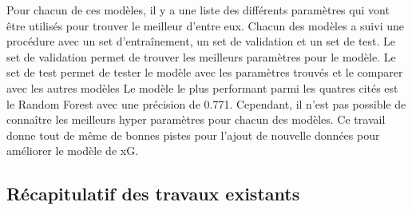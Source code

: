 \documentclass[12pt]{article}
\begin{document}
Pour chacun de ces modèles, il y a une liste des différents paramètres qui vont être utilisés pour trouver le meilleur d'entre eux.
Chacun des modèles a suivi une procédure avec un set d'entraînement, un set de validation et un set de test.
Le set de validation permet de trouver les meilleurs paramètres pour le modèle.
Le set de test permet de tester le modèle avec les paramètres trouvés et le comparer avec les autres modèles
Le modèle le plus performant parmi les quatres cités est le Random Forest avec une précision de 0.771.
Cependant, il n'est pas possible de connaître les meilleurs hyper paramètres pour chacun des modèles.
Ce travail donne tout de même de bonnes pistes pour l'ajout de nouvelle données pour améliorer le modèle de xG.
\newpage

\subsection{Récapitulatif des travaux existants}
\end{document}
